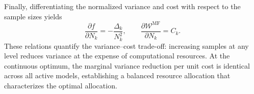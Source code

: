 Finally, differentiating the normalized variance and cost with respect to the sample sizes yields
%
\[
\frac{\partial f}{\partial N_k} = -\frac{\Delta_k}{N_k^2},
\qquad 
\frac{\partial \mathcal{W}^{\text{MF}}}{\partial N_k} = C_k.
\]
%
These relations quantify the variance–cost trade-off: increasing samples at any level reduces variance at the expense of computational resources. At the continuous optimum, the marginal variance reduction per unit cost is identical across all active models, establishing a balanced resource allocation that characterizes the optimal allocation.



















